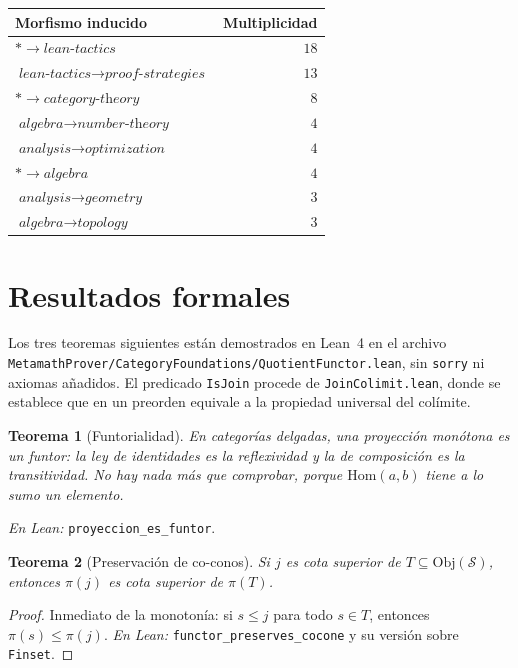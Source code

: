 \documentclass[11pt,a4paper]{article}
\theoremstyle{plain}
\newtheorem{teorema}{Teorema}[section]
\theoremstyle{definition}
\theoremstyle{remark}
\newcommand{\Skills}{\mathcal{S}}
\newcommand{\base}{\ast}
\begin{document}
\begin{center}
\begin{tabular}{lr}
\toprule
Morfismo inducido & Multiplicidad \\
\midrule
$\base \to \textit{lean-tactics}$ & $18$ \\
$\textit{lean-tactics} \to \textit{proof-strategies}$ & $13$ \\
$\base \to \textit{category-theory}$ & $8$ \\
$\textit{algebra} \to \textit{number-theory}$ & $4$ \\
$\textit{analysis} \to \textit{optimization}$ & $4$ \\
$\base \to \textit{algebra}$ & $4$ \\
$\textit{analysis} \to \textit{geometry}$ & $3$ \\
$\textit{algebra} \to \textit{topology}$ & $3$ \\
\bottomrule
\end{tabular}
\end{center}

\section{Resultados formales}

Los tres teoremas siguientes están demostrados en Lean~4 en el archivo
\texttt{MetamathProver/CategoryFoundations/QuotientFunctor.lean}, sin
\texttt{sorry} ni axiomas añadidos. El predicado \texttt{IsJoin} procede de
\texttt{JoinColimit.lean}, donde se establece que en un preorden equivale a la
propiedad universal del colímite.

\begin{teorema}[Funtorialidad]
\label{thm:funtor}
En categorías delgadas, una proyección monótona es un funtor: la ley de
identidades es la reflexividad y la de composición es la transitividad. No hay
nada más que comprobar, porque $\mathrm{Hom}(a,b)$ tiene a lo sumo un elemento.
\end{teorema}

\noindent\emph{En Lean:} \texttt{proyeccion\_es\_funtor}.

\begin{teorema}[Preservación de co-conos]
\label{thm:cocono}
Si $j$ es cota superior de $T\subseteq\mathrm{Obj}(\Skills)$, entonces $\pi(j)$
es cota superior de $\pi(T)$.
\end{teorema}

\begin{proof}
Inmediato de la monotonía: si $s\le j$ para todo $s\in T$, entonces
$\pi(s)\le\pi(j)$. \emph{En Lean:} \texttt{functor\_preserves\_cocone} y su
versión sobre \texttt{Finset}.
\end{proof}
\end{document}
